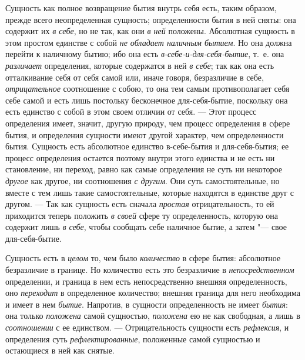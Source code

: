Сущность как полное возвращение бытия внутрь себя есть, таким образом,
прежде всего неопределенная сущность; определенности бытия в ней сняты: она
содержит их {\em в себе}, но не так, как они
{\em в ней} положены. Абсолютная сущность в этом
простом единстве с собой {\em не обладает наличным
бытием}. Но она должна перейти к наличному бытию; ибо она есть
{\em в-себе-и-для-себя-бытие}, т.~е. она
{\em различает} определения, которые содержатся в ней
{\em в себе}; так как она есть отталкивание себя от
себя самой или, иначе говоря, безразличие в себе,
{\em отрицательное} соотношение с собою, то она тем
самым противополагает себя себе самой и есть лишь постольку бесконечное
для-себя-бытие, поскольку она есть единство с собой в этом своем отличии от
себя. --- Этот процесс определения имеет, значит, другую природу, чем процесс
определения в сфере бытия, и определения сущности имеют другой характер,
чем определенности бытия. Сущность есть абсолютное единство в-себе-бытия и
для-себя-бытия; ее процесс определения остается поэтому внутри этого
единства и не есть ни становление, ни переход, равно как самые определения
не суть ни некоторое {\em другое} как другое, ни
соотношения {\em с другим}. Они суть самостоятельные,
но вместе с тем лишь такие самостоятельные, которые находятся в единстве
друг с другом. --- Так как сущность есть сначала
{\em простая} отрицательность, то ей приходится теперь
положить {\em в своей} сфере ту определенность, которую
она содержит лишь {\em в себе}, чтобы сообщать себе
наличное бытие, а затем "--- свое для-себя-бытие.

Сущность есть в {\em целом} то, чем было
{\em количество} в сфере бытия: абсолютное безразличие
в границе. Но количество есть это безразличие в
{\em непосредственном} определении, и граница в нем
есть непосредственно внешняя определенность, оно
{\em переходит} в определенное количество; внешняя
граница для него необходима и имеет в нем {\em бытие}.
Напротив, в сущности определенность не имеет
{\em бытия}: она только
{\em положена} самой сущностью,
{\em положена} ею не как свободная, а лишь в
{\em соотношении} с ее единством. --- Отрицательность
сущности есть {\em рефлексия}, и определения суть
{\em рефлектированные}, положенные самой сущностью и
остающиеся в ней как снятые.

